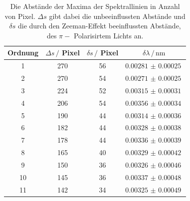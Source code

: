 \begin{table}
    \centering
    \caption{Die Abstände der Maxima der Spektrallinien in Anzahl von Pixel.
    $\Delta s$ gibt dabei die unbeeinflussten Abstände und $\delta s$ die durch den Zeeman-Effekt beeinflussten Abstände, des $\pi -$ Polarisirtem Lichts an.}
    \begin{tabular}{cccc}
        \toprule
        Ordnung & $\Delta s \, /$ Pixel  & $\delta s \, /$ Pixel & $\delta \lambda \, / \, \si{\nano\meter}$  \\
        \midrule
        1  &    270 &   56  & $\SI{0.00281(25)}{}$ \\
        2  &    270 &   54  & $\SI{0.00271(25)}{}$ \\
        3  &    224 &   52  & $\SI{0.00315(31)}{}$ \\
        4  &    206 &   54  & $\SI{0.00356(34)}{}$ \\
        5  &    190 &   44  & $\SI{0.00314(36)}{}$ \\
        6  &    182 &   44  & $\SI{0.00328(38)}{}$ \\
        7  &    178 &   44  & $\SI{0.00336(39)}{}$ \\
        8  &    165 &   40  & $\SI{0.00329(42)}{}$ \\
        9  &    150 &   36  & $\SI{0.00326(46)}{}$ \\
        10 &    145 &   36  & $\SI{0.00337(48)}{}$ \\
        11 &    142 &   34  & $\SI{0.00325(49)}{}$ \\
    \end{tabular}
    \label{tab:blau-pi}
\end{table}

